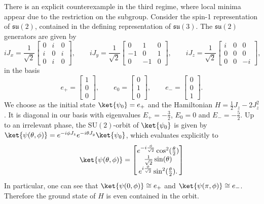 \documentclass{article}
\begin{document}
There is an explicit counterexample in the third regime, where local minima appear due to the restriction on the subgroup.
Consider the spin-1 representation of \(\mathfrak{su}(2)\), contained in the defining representation of \(\mathfrak{su}(3)\).
The \(\mathfrak{su}(2)\) generators are given by
\begin{equation}
    i J_x = \frac{1}{\sqrt{2}} \begin{bmatrix}
        0 & i & 0 \\ i & 0 & i \\ 0 & i & 0
    \end{bmatrix}, \qquad i J_y = \frac{1}{\sqrt{2}} \begin{bmatrix}
        0 & 1 & 0 \\ -1 & 0 & 1 \\ 0 & -1 & 0
    \end{bmatrix}, \qquad i J_z = \frac{1}{\sqrt{2}} \begin{bmatrix}
        i & 0 & 0 \\ 0 & 0 & 0 \\ 0 & 0 & -i
    \end{bmatrix},
\end{equation}
in the basis
\begin{equation}
    e_+ = \begin{bmatrix}
        1 \\ 0 \\ 0
    \end{bmatrix}, \qquad e_0 = \begin{bmatrix}
        0 \\ 1 \\ 0
    \end{bmatrix}, \qquad e_- = \begin{bmatrix}
        0 \\ 0 \\ 1
    \end{bmatrix}.
\end{equation}
We choose as the initial state \(\ket{\psi_0} = e_+\) and the Hamiltonian \(H = \frac{1}{2}J_z - 2 J_z^2\).
It is diagonal in our basis with eigenvalues \(E_+ = - \frac{3}{2}\), \(E_0 = 0\) and \(E_- = - \frac{5}{2}\).
Up to an irrelevant phase, the \(\mathrm{SU}(2)\)-orbit of \(\ket{\psi_0}\) is given by \(\ket{\psi(\theta, \phi)} = e^{-i\phi J_z} e^{-i\theta J_y} \ket{\psi_0}\), which evaluates explicitly to
\begin{equation}
    \ket{\psi(\theta, \phi)} = \begin{bmatrix}
        e^{-i\frac{\phi}{\sqrt{2}}} \cos^2(\frac{\theta}{2}) \\
        \frac{1}{\sqrt{2}} \sin(\theta) \\
        e^{i \frac{\phi}{\sqrt{2}}} \sin^2(\frac{\theta}{2}).
    \end{bmatrix}
\end{equation}
In particular, one can see that \(\ket{\psi(0, \phi)} \cong e_+\) and \(\ket{\psi(\pi, \phi)} \cong e_-\).
Therefore the ground state of \(H\) is even contained in the orbit.
\end{document}
